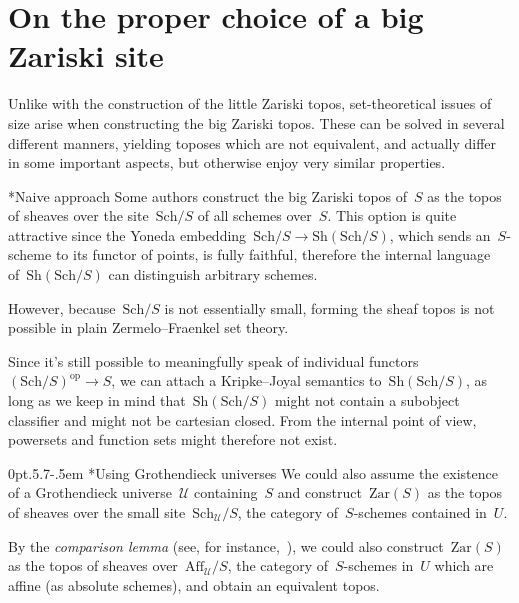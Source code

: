 \documentclass[10pt,reqno,a4paper]{amsbook}
\makeatletter
\theoremstyle{definition}
\theoremstyle{plain}
\theoremstyle{remark}
\newcommand{\U}{\mathcal{U}}
\newcommand{\Sh}{\mathrm{Sh}}
\newcommand{\Zar}{\mathrm{Zar}}
\newcommand{\Sch}{\mathrm{Sch}}
\newcommand{\Aff}{\mathrm{Aff}}
\newcommand{\op}{\mathrm{op}}
\newcommand{\?}{\,{:}\,}
\renewcommand{\_}{\mathpunct{.}\,}
\newcommand{\nocontentsline}[3]{}
\newcommand{\tocless}[1]{\let\addcontentsline=\nocontentsline}
\def\subsection{\@startsection{subsection}{2}%
  {0pt}{.5\linespacing\@plus.7\linespacing}{-.5em}%
  {\normalfont\bfseries}}
\makeatother
\begin{document}
\section{On the proper choice of a big Zariski site}
\label{sect:proper-choice-of-site}

Unlike with the construction of the little Zariski topos, set-theoretical
issues of size arise when constructing the big Zariski topos. These can be
solved in several different manners, yielding toposes which are not equivalent,
and actually differ in some important aspects, but otherwise enjoy very similar
properties.

{\tocless

\subsection*{Naive approach}
Some authors construct the big Zariski topos of~$S$ as the topos of
sheaves over the site~$\Sch/S$ of all schemes over~$S$. This option is quite
attractive since the Yoneda embedding~$\Sch/S \to \Sh(\Sch/S)$, which sends
an~$S$-scheme to its functor of points, is fully faithful, therefore the
internal language of~$\Sh(\Sch/S)$ can distinguish arbitrary schemes.

However, because~$\Sch/S$ is not essentially small, forming the sheaf topos is
not possible in plain Zermelo--Fraenkel set theory.

Since it's still possible to meaningfully speak of individual
functors~$(\Sch/S)^\op \to S$, we can attach a Kripke--Joyal semantics
to~$\Sh(\Sch/S)$, as long as we keep in mind that~$\Sh(\Sch/S)$ might
not contain a subobject classifier and might not be cartesian closed. From the
internal point of view, powersets and function sets might therefore not exist.

\subsection*{Using Grothendieck universes}
We could also assume the existence of a Gro\-then\-dieck universe~$\U$
containing~$S$ and construct~$\Zar(S)$ as the topos of sheaves over the
small site~$\Sch_\U/S$, the category of~$S$-schemes contained in~$U$.

By the \emph{comparison lemma} (see, for instance,~\cite[Theorem~3.7]{caramello:preliminaries}), we could also construct~$\Zar(S)$ as
the topos of sheaves over~$\Aff_\U/S$, the category of~$S$-schemes in~$U$ which
are affine (as absolute schemes), and obtain an equivalent topos.

}
\end{document}
